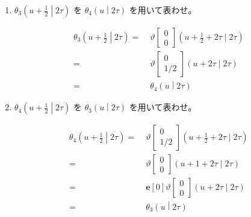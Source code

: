 \documentclass[12pt,b5paper]{ltjsarticle}
\begin{document}
\begin{enumerate}
\begin{enumerate}
\begin{enumerate}
              \item $\displaystyle \theta_{3} \left(u+\frac{1}{2} \middle| 2\tau \right)$
                    を
                    $\displaystyle \theta_{4} \left(u \middle| 2\tau \right)$
                    を用いて表わせ。

                    \dotfill

                    \begin{align}
                     \theta_{3} \left(u+\frac{1}{2} \middle| 2\tau \right)
                     =&\;
                     \vartheta \begin{bmatrix} 0 \\ 0 \end{bmatrix} (u+\frac{1}{2}+2\tau \mid 2\tau)\\
                     =&\;
                     \vartheta \begin{bmatrix} 0 \\ 1/2 \end{bmatrix} (u+2\tau \mid 2\tau)\\
                     =&\; \theta_{4} \left(u \middle| 2\tau \right)
                    \end{align}

                    \hrulefill

              \item $\displaystyle \theta_{4} \left(u+\frac{1}{2} \middle| 2\tau \right)$
                    を
                    $\displaystyle \theta_{3} \left(u \middle| 2\tau \right)$
                    を用いて表わせ。

                    \dotfill

                    \begin{align}
                     \theta_{4} \left(u+\frac{1}{2} \middle| 2\tau \right)
                     =&\;
                     \vartheta \begin{bmatrix} 0 \\ 1/2 \end{bmatrix} (u+\frac{1}{2}+2\tau \mid 2\tau)\\
                     =&\;
                     \vartheta \begin{bmatrix} 0 \\ 0 \end{bmatrix} (u+1+2\tau \mid 2\tau)\\
                     =&\; \mathbf{e}[0]
                     \vartheta \begin{bmatrix} 0 \\ 0 \end{bmatrix} (u+2\tau \mid 2\tau)\\
                     =&\;
                     \theta_{3} \left(u \middle| 2\tau \right)
                    \end{align}


\end{enumerate}
\end{enumerate}
\end{enumerate}
\end{document}
